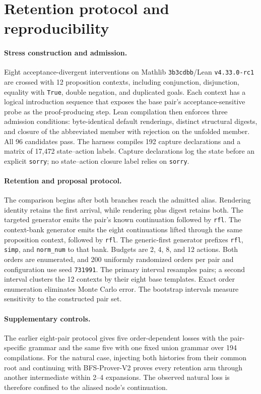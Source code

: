 \documentclass[11pt]{article}
\begin{document}
\section{Retention protocol and reproducibility}
\label{app:retention}

\paragraph{Stress construction and admission.}
Eight acceptance-divergent interventions on Mathlib \texttt{3b3cdbb}/Lean
\texttt{v4.33.0-rc1} are crossed with 12 proposition contexts, including
conjunction, disjunction, equality with \texttt{True}, double negation, and
duplicated goals. Each context has a logical introduction sequence that exposes
the base pair's acceptance-sensitive probe as the proof-producing step. Lean
compilation then enforces three admission conditions: byte-identical default
renderings, distinct structural digests, and closure of the abbreviated member
with rejection on the unfolded member. All 96 candidates pass. The harness
compiles 192 capture declarations and a matrix of 17{,}472 state--action labels.
Capture declarations log the state before an explicit \texttt{sorry}; no
state--action closure label relies on \texttt{sorry}.

\paragraph{Retention and proposal protocol.}
The comparison begins after both branches reach the admitted alias. Rendering
identity retains the first arrival, while rendering plus digest retains both.
The targeted generator emits the pair's known continuation followed by
\texttt{rfl}. The context-bank generator emits the eight continuations lifted
through the same proposition context, followed by \texttt{rfl}. The
generic-first generator prefixes \texttt{rfl}, \texttt{simp}, and
\texttt{norm\_num} to that bank. Budgets are 2, 4, 8, and 12 actions. Both
orders are enumerated, and 200 uniformly randomized orders per pair and
configuration use seed \texttt{731991}. The primary interval resamples pairs;
a second interval clusters the 12 contexts by their eight base templates.
Exact order enumeration eliminates Monte Carlo error. The bootstrap intervals
measure sensitivity to the constructed pair set.

\paragraph{Supplementary controls.}
The earlier eight-pair protocol gives five order-dependent losses with the
pair-specific grammar and the same five with one fixed union grammar over 194
compilations. For the natural case, injecting both histories from their common
root and continuing with BFS-Prover-V2 proves every retention arm through
another intermediate within 2--4 expansions. The observed natural loss is
therefore confined to the aliased node's continuation.
\end{document}
